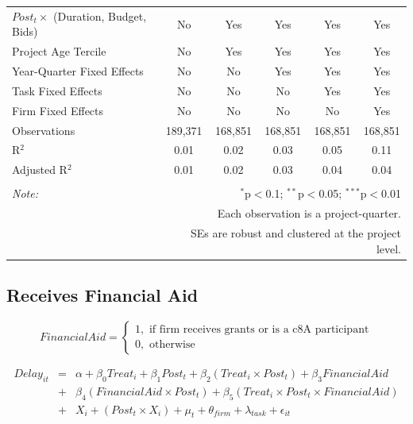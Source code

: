 \documentclass[
]{article}
\begin{document}
\begin{table}[H]
\begin{tabular}{@{\extracolsep{-2pt}}lccccc}
$Post_t \times $  (Duration, Budget, Bids) & No & Yes & Yes & Yes & Yes \\ 
Project Age Tercile & No & Yes & Yes & Yes & Yes \\ 
Year-Quarter Fixed Effects & No & No & Yes & Yes & Yes \\ 
Task Fixed Effects & No & No & No & Yes & Yes \\ 
Firm Fixed Effects & No & No & No & No & Yes \\ 
Observations & 189,371 & 168,851 & 168,851 & 168,851 & 168,851 \\ 
R$^{2}$ & 0.01 & 0.02 & 0.03 & 0.05 & 0.11 \\ 
Adjusted R$^{2}$ & 0.01 & 0.02 & 0.03 & 0.04 & 0.04 \\ 
\hline 
\hline \\[-1.8ex] 
\textit{Note:}  & \multicolumn{5}{r}{$^{*}$p$<$0.1; $^{**}$p$<$0.05; $^{***}$p$<$0.01} \\ 
 & \multicolumn{5}{r}{Each observation is a project-quarter.} \\ 
 & \multicolumn{5}{r}{SEs are robust and clustered at the project level.} \\ 
\end{tabular} 
\end{table}

\hypertarget{receives-financial-aid}{%
\subsection{Receives Financial Aid}\label{receives-financial-aid}}

\[ FinancialAid = \begin{cases} 1, \text{ if firm receives grants or is a c8A participant}\\
0, \text{ otherwise} \end{cases}\]

\[ \begin{aligned}
Delay_{it} &=& \alpha+\beta_0 Treat_i + \beta_1 Post_t + \beta_2 (Treat_i \times Post_t) +\beta_3 FinancialAid \\
&+& \beta_4 (FinancialAid \times Post_t) + \beta_5 (Treat_i \times Post_t \times FinancialAid) \\ 
&+&X_i + (Post_t \times X_i) + \mu_t + \theta_{firm} + \lambda_{task}+ \epsilon_{it}
\end{aligned}\]
\end{document}
